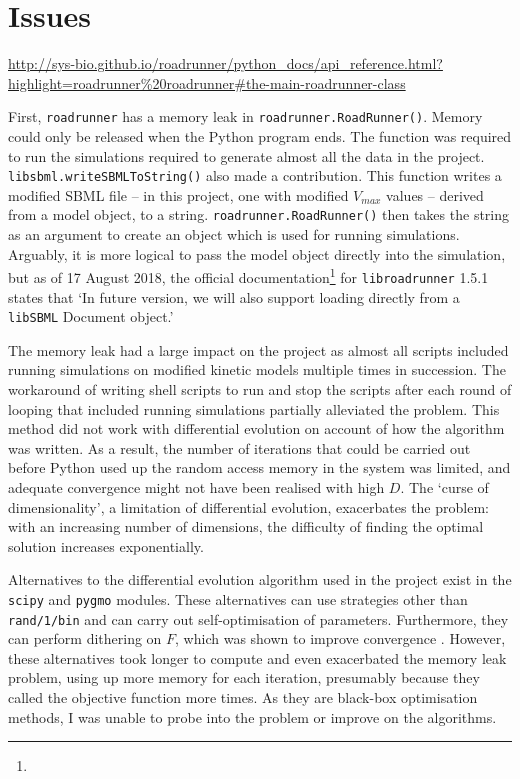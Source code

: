 \documentclass[parskip=full, numbers=noenddot]{scrreprt}
\begin{document}
\section{Issues}
\label{sec:issues}

\urldef\myurl\url{http://sys-bio.github.io/roadrunner/python_docs/api_reference.html?highlight=roadrunner%20roadrunner#the-main-roadrunner-class}

First, \texttt{roadrunner} has a memory leak in \texttt{road\-runner.\-Road\-Runner\-()}. Memory could only be released when the Python program ends. The function was required to run the simulations required to generate almost all the data in the project. \texttt{libsbml\-.write\-SBML\-To\-String\-()} also made a contribution. This function writes a modified SBML file -- in this project, one with modified $V_{max}$ values -- derived from a model object, to a string. \texttt{road\-runner.\-Road\-Runner\-()} then takes the string as an argument to create an object which is used for running simulations. Arguably, it is more logical to pass the model object directly into the simulation, but as of 17 August 2018, the official documentation\footnote{\myurl} for \texttt{libroadrunner} 1.5.1 states that `In future version, we will also support loading directly from a \texttt{libSBML} Document object.'

The memory leak had a large impact on the project as almost all scripts included running simulations on modified kinetic models multiple times in succession. The workaround of writing shell scripts to run and stop the scripts after each round of looping that included running simulations partially alleviated the problem. This method did not work with differential evolution on account of how the algorithm was written. As a result, the number of iterations that could be carried out before Python used up the random access memory in the system was limited, and adequate convergence might not have been realised with high $D$. The `curse of dimensionality', a limitation of differential evolution, exacerbates the problem: with an increasing number of dimensions, the difficulty of finding the optimal solution increases exponentially.

Alternatives to the differential evolution algorithm used in the project exist in the \texttt{scipy} and \texttt{pygmo} modules. These alternatives can use strategies other than \texttt{rand/1/bin} and can carry out self-optimisation of parameters. Furthermore, they can perform dithering on $F$, which was shown to improve convergence \citep{storn_usage_1996}. However, these alternatives took longer to compute and even exacerbated the memory leak problem, using up more memory for each iteration, presumably because they called the objective function more times. As they are black-box optimisation methods, I was unable to probe into the problem or improve on the algorithms.
\end{document}
